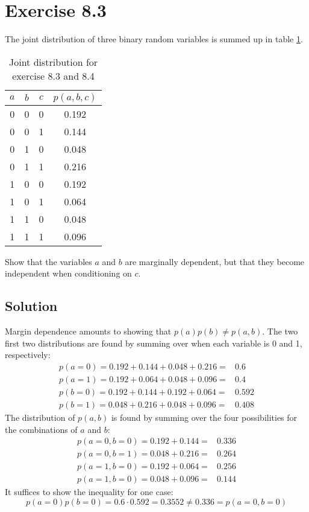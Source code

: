\documentclass[12pt, a4paper]{article}
\numberwithin{equation}{section}
\begin{document}
\section{Exercise 8.3}
The joint distribution of three binary random variables is summed up in table \ref{table:e8_3}.

\begin{table}[b]
\centering
\begin{tabular}{|c|c|c|c|}
\hline
$a$ & $b$ & $c$ & $p(a,b,c)$ \\ \hline
0 & 0 & 0 & 0.192    \\ \hline
0 & 0 & 1 & 0.144    \\ \hline
0 & 1 & 0 & 0.048    \\ \hline
0 & 1 & 1 & 0.216    \\ \hline
1 & 0 & 0 & 0.192    \\ \hline
1 & 0 & 1 & 0.064    \\ \hline
1 & 1 & 0 & 0.048    \\ \hline
1 & 1 & 1 & 0.096    \\ \hline
\end{tabular}
\caption{Joint distribution for exercise 8.3 and 8.4}
\label{table:e8_3}
\end{table}

Show that the variables $a$ and $b$ are marginally dependent, but that they become independent when conditioning on $c$.

\subsection{Solution}
Margin dependence amounts to showing that $p(a)p(b)\neq p(a,b)$. The two first two distributions are found by summing over when each variable is 0 and 1, respectively:
\begin{align}
p(a=0)=0.192+0.144+0.048+0.216=& 0.6 \\
p(a=1)=0.192+0.064+0.048+0.096=& 0.4 \\
p(b=0)=0.192+0.144+0.192+0.064=& 0.592 \\
p(b=1)=0.048+0.216+0.048+0.096=& 0.408
\end{align}
The distribution of $p(a,b)$ is found by summing over the four possibilities for the combinations of $a$ and $b$:
\begin{align}
p(a=0, b=0)=0.192+0.144=& 0.336 \\
p(a=0, b=1)=0.048+0.216=& 0.264 \\
p(a=1, b=0)=0.192+0.064=& 0.256 \\
p(a=1, b=0)=0.048+0.096=& 0.144
\end{align}
It suffices to show the inequality for one case:
\begin{equation}
p(a=0)p(b=0)=0.6\cdot 0.592=0.3552\neq 0.336=p(a=0,b=0)
\end{equation}
\end{document}
